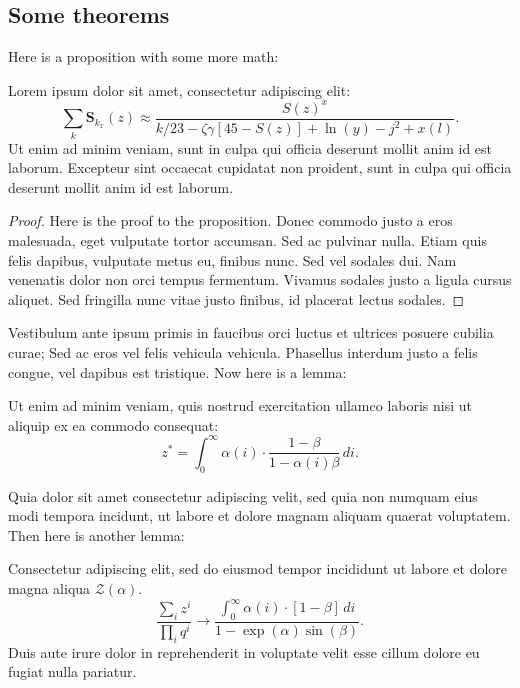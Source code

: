 \documentclass[letterpaper,11pt,leqno]{article}
\begin{document}
\subsection{Some theorems}

Here is a proposition with some more math:   

\begin{proposition}\label{p:type1}  Lorem ipsum dolor sit amet, consectetur adipiscing elit:
\begin{equation}
\sum_k\bm{S}_{k_x}(z) \approx \frac{S(z)^x}{k / 23 -\zeta\gamma [45- S(z)] + \ln(y) - j^2+x(l)}.
\label{e:type1}\end{equation}
Ut enim ad minim veniam, sunt in culpa qui officia deserunt mollit anim id est laborum. Excepteur sint occaecat cupidatat non proident, sunt in culpa qui officia deserunt mollit anim id est laborum.
\end{proposition}

\begin{proof} Here is the proof to the proposition. Donec commodo justo a eros malesuada, eget vulputate tortor accumsan. Sed ac pulvinar nulla. Etiam quis felis dapibus, vulputate metus eu, finibus nunc. Sed vel sodales dui. Nam venenatis dolor non orci tempus fermentum. Vivamus sodales justo a ligula cursus aliquet. Sed fringilla nunc vitae justo finibus, id placerat lectus sodales.\end{proof} 

Vestibulum ante ipsum primis in faucibus orci luctus et ultrices posuere cubilia curae; Sed ac eros vel felis vehicula vehicula. Phasellus interdum justo a felis congue, vel dapibus est tristique. Now here is a lemma:

\begin{lemma}\label{p:cv} Ut enim ad minim veniam, quis nostrud exercitation ullamco laboris nisi ut aliquip ex ea commodo consequat:
\begin{equation}
z^* = \int_{0}^{\infty} \alpha(i) \cdot \frac{1-\beta}{1-\alpha(i)\beta}\,di.
\label{e:cv}\end{equation}
\end{lemma}

Quia dolor sit amet consectetur adipiscing velit, sed quia non numquam eius modi tempora incidunt, ut labore et dolore magnam aliquam quaerat voluptatem.  Then here is another lemma:

\begin{lemma}
Consectetur adipiscing elit, sed do eiusmod tempor incididunt ut labore et dolore magna aliqua $\mathcal{Z}(\alpha)$. 
\begin{equation*}
\frac{\sum_i z^i}{\prod_i q^i} \to \frac{\int_{0}^{\infty} \alpha(i) \cdot [1-\beta]\,di}{1-\exp(\alpha)\sin(\beta)}.
\end{equation*}
Duis aute irure dolor in reprehenderit in voluptate velit esse cillum dolore eu fugiat nulla pariatur. 
\end{lemma}
\end{document}
